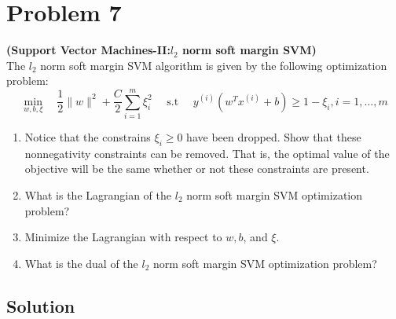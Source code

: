 \section*{Problem 7}

\textbf{(Support Vector Machines-II:\@ \( l_{2}
    \) norm soft margin SVM)}\\
The \( l_{2} \) norm soft margin SVM algorithm is given by the following optimization problem:
\[
    \min _{w, b, \xi} \quad \frac{1}{2}\|w\|^{2}+\frac{C}{2} \sum_{i=1}^{m} \xi_{i}^{2} \quad \text { s.t } \quad y^{(i)}\left(w^{T} x^{(i)}+b\right) \geq 1-\xi_{i}, i=1, \ldots, m
\]
\begin{enumerate}[label= (\alph*), noitemsep, topsep=0pt]
    \item Notice that the constrains \( \xi_{i} \geq 0 \) have been dropped.
          Show that these nonnegativity constraints can be removed.
          That is, the optimal value of the objective will be the same whether or not these constraints are present.

    \item What is the Lagrangian of the \( l_{2} \) norm soft margin SVM optimization problem?

    \item Minimize the Lagrangian with respect to \( w, b \), and \( \xi \).

    \item What is the dual of the \( l_{2} \) norm soft margin SVM optimization problem?
\end{enumerate}

\subsection*{Solution}
